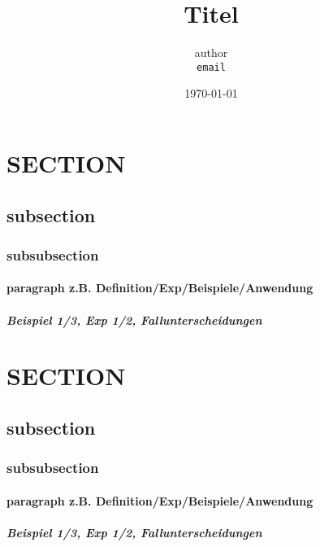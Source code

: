 \documentclass[11pt]{article}
\begin{document}
	\title{Titel}
		\author
		{
			author\\
			{\small 	\texttt{email}}
		}
		\date{\today}
	\maketitle
	\tableofcontents
	\setcounter{section}{14} %
	
	\newpage
	
\section{SECTION }	
	\subsection{ subsection }	
		\subsubsection{ subsubsection }
			\paragraph{paragraph z.B. Definition/Exp/Beispiele/Anwendung }
				\subparagraph{Beispiel 1/3, Exp 1/2, Fallunterscheidungen}	
				
\newpage	
	

{}
\section*{SECTION}
	\subsection*{ subsection }
		\subsubsection*{ subsubsection }
			\paragraph{paragraph z.B. Definition/Exp/Beispiele/Anwendung }
				\subparagraph{Beispiel 1/3, Exp 1/2, Fallunterscheidungen}	

	
\end{document}
